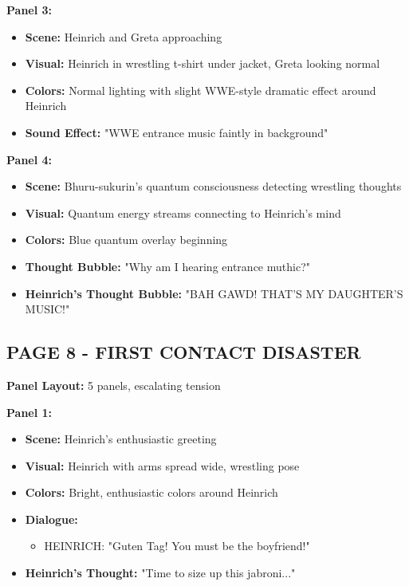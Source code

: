 \documentclass[12pt,a4paper]{article}
\begin{document}
\textbf{Panel 3:}
\begin{itemize}
\item \textbf{Scene:} Heinrich and Greta approaching
\item \textbf{Visual:} Heinrich in wrestling t-shirt under jacket, Greta looking normal
\item \textbf{Colors:} Normal lighting with slight WWE-style dramatic effect around Heinrich
\item \textbf{Sound Effect:} "WWE entrance music faintly in background"
\end{itemize}

\textbf{Panel 4:}
\begin{itemize}
\item \textbf{Scene:} Bhuru-sukurin's quantum consciousness detecting wrestling thoughts
\item \textbf{Visual:} Quantum energy streams connecting to Heinrich's mind
\item \textbf{Colors:} Blue quantum overlay beginning
\item \textbf{Thought Bubble:} "Why am I hearing entrance muthic?"
\item \textbf{Heinrich's Thought Bubble:} "BAH GAWD! THAT'S MY DAUGHTER'S MUSIC!"
\end{itemize}

\subsection{PAGE 8 - FIRST CONTACT DISASTER}

\textbf{Panel Layout:} 5 panels, escalating tension

\textbf{Panel 1:}
\begin{itemize}
\item \textbf{Scene:} Heinrich's enthusiastic greeting
\item \textbf{Visual:} Heinrich with arms spread wide, wrestling pose
\item \textbf{Colors:} Bright, enthusiastic colors around Heinrich
\item \textbf{Dialogue:}
\begin{itemize}
\item HEINRICH: "Guten Tag! You must be the boyfriend!"
\end{itemize}
\item \textbf{Heinrich's Thought:} "Time to size up this jabroni..."
\end{itemize}
\end{document}
